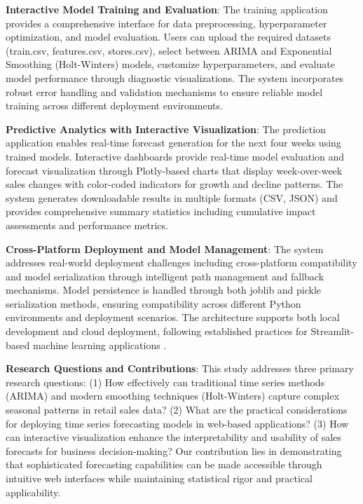 \textbf{Interactive Model Training and Evaluation}: The training application provides a comprehensive interface for data preprocessing, hyperparameter optimization, and model evaluation. Users can upload the required datasets (train.csv, features.csv, stores.csv), select between ARIMA and Exponential Smoothing (Holt-Winters) models, customize hyperparameters, and evaluate model performance through diagnostic visualizations. The system incorporates robust error handling and validation mechanisms to ensure reliable model training across different deployment environments.

\textbf{Predictive Analytics with Interactive Visualization}: The prediction application enables real-time forecast generation for the next four weeks using trained models. Interactive dashboards provide real-time model evaluation and forecast visualization through Plotly-based charts that display week-over-week sales changes with color-coded indicators for growth and decline patterns. The system generates downloadable results in multiple formats (CSV, JSON) and provides comprehensive summary statistics including cumulative impact assessments and performance metrics.

\textbf{Cross-Platform Deployment and Model Management}: The system addresses real-world deployment challenges including cross-platform compatibility and model serialization through intelligent path management and fallback mechanisms. Model persistence is handled through both joblib and pickle serialization methods, ensuring compatibility across different Python environments and deployment scenarios. The architecture supports both local development and cloud deployment, following established practices for Streamlit-based machine learning applications \cite{Mane:2022}.

\textbf{Research Questions and Contributions}: This study addresses three primary research questions: (1) How effectively can traditional time series methods (ARIMA) and modern smoothing techniques (Holt-Winters) capture complex seasonal patterns in retail sales data? (2) What are the practical considerations for deploying time series forecasting models in web-based applications? (3) How can interactive visualization enhance the interpretability and usability of sales forecasts for business decision-making? Our contribution lies in demonstrating that sophisticated forecasting capabilities can be made accessible through intuitive web interfaces while maintaining statistical rigor and practical applicability.

